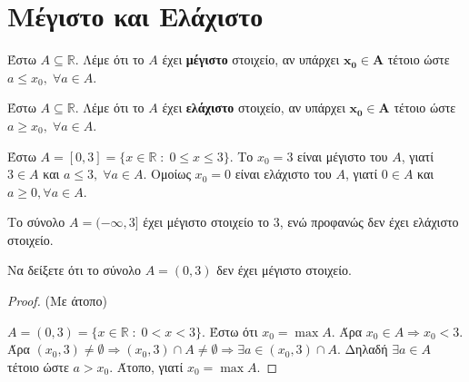 \section{Μέγιστο και Ελάχιστο}

\begin{mybox1}
\begin{dfn}
  Έστω $ A \subseteq \mathbb{R} $. Λέμε ότι το $A$ έχει \textbf{μέγιστο} στοιχείο, 
  αν υπάρχει $ \bm{x_{0} \in A} $ τέτοιο ώστε $ a \leq x_{0}, \; \forall a \in A $.
\end{dfn}
\end{mybox1}

\begin{mybox1}
\begin{dfn}
  Έστω $ A \subseteq \mathbb{R} $. Λέμε ότι το $A$ έχει \textbf{ελάχιστο} στοιχείο, 
  αν υπάρχει $ \bm{x_{0} \in A} $ τέτοιο ώστε $ a \geq x_{0}, \; \forall a \in A$.
\end{dfn}
\end{mybox1}

\begin{example}
  Έστω $ A = [0,3] = \{ x \in \mathbb{R} \; : \; 0 \leq x \leq 3 \} $. 
  Το $ x_{0}= 3 $ είναι μέγιστο του $A$, γιατί $ 3 \in A $ και 
  $ a \leq 3, \; \forall a \in A $. Ομοίως $ x_{0}= 0 $ είναι ελάχιστο 
  του $A$, γιατί $ 0 \in A $ και $ a \geq 0, \forall a \in A $.
\end{example}

\begin{example}
  Το σύνολο $ A=(- \infty, 3] $ έχει μέγιστο στοιχείο το 3, ενώ προφανώς δεν έχει 
  ελάχιστο στοιχείο.
\end{example}

\begin{example}
  Να δείξετε ότι το σύνολο $ A = (0,3) $ δεν έχει μέγιστο στοιχείο.
\end{example}
\begin{proof}(Με άτοπο)
\item {}
  $ A = (0,3) = \{ x \in \mathbb{R} \; : \; 0 < x < 3 \} $. 
  Έστω ότι $ x_{0} = \max A $. Άρα $ x_{0} \in A \Rightarrow  x_{0} 
  < 3$. Άρα  $ (x_{0}, 3) \neq \emptyset \Rightarrow (x_{0},3) \cap A \neq 
  \emptyset \Rightarrow \exists a \in (x_{0},3) \cap A $. Δηλαδή $ 
  \exists a \in A$ τέτοιο ώστε $ a > x_{0} $. Άτοπο, γιατί $ x_{0}= \max A $.
\end{proof}

